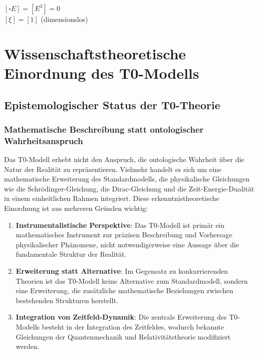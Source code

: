 \documentclass[12pt,a4paper]{article}
\theoremstyle{definition}
\begin{document}
	\begin{einheitencheck}
		$[\square E] = [E^3] = 0$ \checkmark\\
		$[\xi] = [1]$ (dimensionslos) \checkmark
	\end{einheitencheck}
\section{Wissenschaftstheoretische Einordnung des T0-Modells}

\subsection{Epistemologischer Status der T0-Theorie}

\subsubsection{Mathematische Beschreibung statt ontologischer Wahrheitsanspruch}

Das T0-Modell erhebt nicht den Anspruch, die ontologische Wahrheit über die Natur der Realität zu repräsentieren. Vielmehr handelt es sich um eine mathematische Erweiterung des Standardmodells, die physikalische Gleichungen wie die Schrödinger-Gleichung, die Dirac-Gleichung und die Zeit-Energie-Dualität in einem einheitlichen Rahmen integriert. Diese erkenntnistheoretische Einordnung ist aus mehreren Gründen wichtig:

\begin{enumerate}
	\item \textbf{Instrumentalistische Perspektive}: Das T0-Modell ist primär ein mathematisches Instrument zur präzisen Beschreibung und Vorhersage physikalischer Phänomene, nicht notwendigerweise eine Aussage über die fundamentale Struktur der Realität.
	
	\item \textbf{Erweiterung statt Alternative}: Im Gegensatz zu konkurrierenden Theorien ist das T0-Modell keine Alternative zum Standardmodell, sondern eine Erweiterung, die zusätzliche mathematische Beziehungen zwischen bestehenden Strukturen herstellt.
	
	\item \textbf{Integration von Zeitfeld-Dynamik}: Die zentrale Erweiterung des T0-Modells besteht in der Integration des Zeitfeldes, wodurch bekannte Gleichungen der Quantenmechanik und Relativitätstheorie modifiziert werden.
\end{enumerate}
\end{document}
